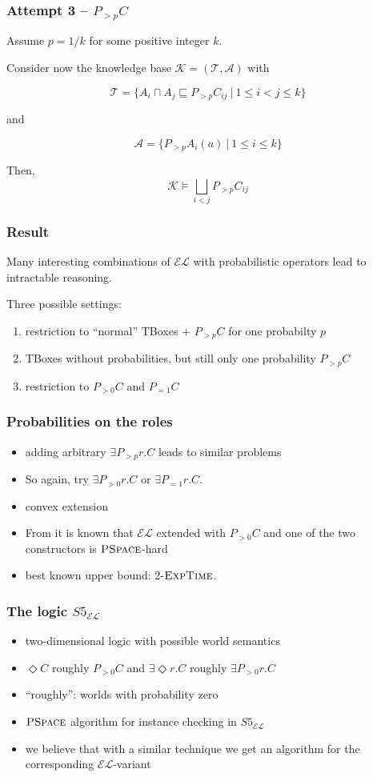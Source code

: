 \documentclass[draft]{beamer}
\newcommand{\el}{\ensuremath{\mathcal{EL}}\xspace}
\newcommand{\exptime}{\ensuremath{\textsc{ExpTime}}\xspace}
\newcommand{\pspace}{\ensuremath{\textsc{PSpace}}\xspace}
\begin{document}
\begin{frame}
  \frametitle{Attempt 3 -- $P_{>p}C$}
  Assume $p=1/k$ for some positive integer $k$.

  Consider now the knowledge base $\mathcal K=(\mathcal T, \mathcal A)$ with

  $$\mathcal T=\{A_i\sqcap A_j\sqsubseteq P_{>p}C_{ij}~|~1\leq i<j\leq k\}$$

  and 

  $$\mathcal A=\{P_{>p}A_i(a)~|~1\leq i\leq k\}$$
  

  \pause
  Then, $$\mathcal K \models \bigsqcup_{i<j}P_{>p}C_{ij}$$
\end{frame}


\begin{frame}
  \frametitle{Result}
  Many interesting combinations of $\el$ with 
  probabilistic operators lead to intractable reasoning. 

  Three possible settings:

  \begin{enumerate}
    \item restriction to ``normal'' TBoxes + $P_{>p}C$ for one probabilty $p$
    \item TBoxes without probabilities, but still only one probability $P_{>p}C$
    \item restriction to $P_{>0}C$ and $P_{=1}C$
  \end{enumerate}
\end{frame}


\begin{frame}
  \frametitle{Probabilities on the roles}
  \begin{itemize}
    \item adding arbitrary $\exists P_{>p}r.C$ leads to similar problems 
    \item So again, try $\exists P_{>0}r.C$ or $\exists P_{=1}r.C$. 
    \item convex extension
    \item From \cite{ls} it is known that \el extended with $P_{>0}C$ and one of the two constructors is \pspace-hard
    \item best known upper bound: 2-$\exptime$.
  \end{itemize}
\end{frame}

\begin{frame}
  \frametitle{The logic $S5_{\el}$}
  \begin{itemize}
    \item two-dimensional logic with possible world semantics
    \item $\Diamond C$ roughly $P_{>0}C$ and $\exists\Diamond r.C$ roughly $\exists P_{>0}r.C$
    \item ``roughly'': worlds with probability zero
    \item \pspace algorithm for instance checking in $S5_{\el}$
    \item we believe that with a similar technique we get an algorithm for the corresponding \el-variant
  \end{itemize}
\end{frame}
\end{document}
